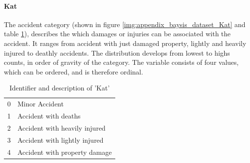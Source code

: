 \documentclass[a4paper,headsepline,footsepline,fontsize=11pt,BCOR=12mm,DIV=12]{report}
\begin{document}
\paragraph{Kat}
The accident category (shown in figure \ref{img:appendix_baysis_dataset_Kat} and table \ref{table:baysis_dataset_Kat}), describes the which damages or injuries can be associated with the accident. It ranges from accident with just  damaged property, lightly and heavily injured to deathly accidents. The distribution develops from lowest to highs counts, in order of gravity of the category. The variable consists of four values, which can be ordered, and is therefore ordinal.
\noindent
\begin{table}[h!]
	\centering
	\begin{tabular}{c|l}  
 		0 & Minor Accident  \\
 		1 & Accident with deaths  \\ 
 		2 & Accident with heavily injured  \\
 		3 & Accident with lightly injured  \\
 		4 & Accident with property damage  \\
	\end{tabular}
	\caption{Identifier and description of 'Kat'}
	\label{table:baysis_dataset_Kat}
\end{table}
\end{document}
